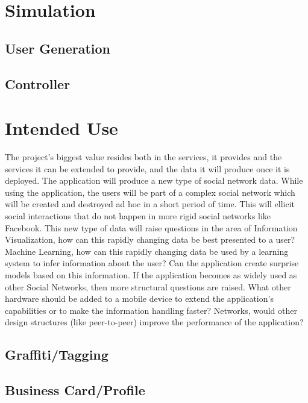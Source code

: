 \documentclass[11pt]{article}
\begin{document}
\section{Simulation}

\subsection{User Generation}

\subsection{Controller}







\section{Intended Use}




The project's biggest value resides both in the services, it provides and the services it can be extended to provide, and the data it will produce once it is deployed. The application will produce a new type of social network data. While using the application, the users will be part of a complex social network which will be created and destroyed ad hoc in a short period of time. This will ellicit social interactions that do not happen in more rigid social networks like Facebook. This new type of data will raise questions in the area of Information Visualization, how can this rapidly changing data be best presented to a user? Machine Learning, how can this rapidly changing data be used by a learning system to infer information about the user? Can the application create surprise models based on this information. If the application becomes as widely used as other Social Networks, then more structural questions are raised. What other hardware should be added to a mobile device to extend the application's capabilities or to make the information handling faster? Networks, would other design structures (like peer-to-peer) improve the performance of the application?


\subsection{Graffiti/Tagging}

\subsection{Business Card/Profile}
\end{document}
